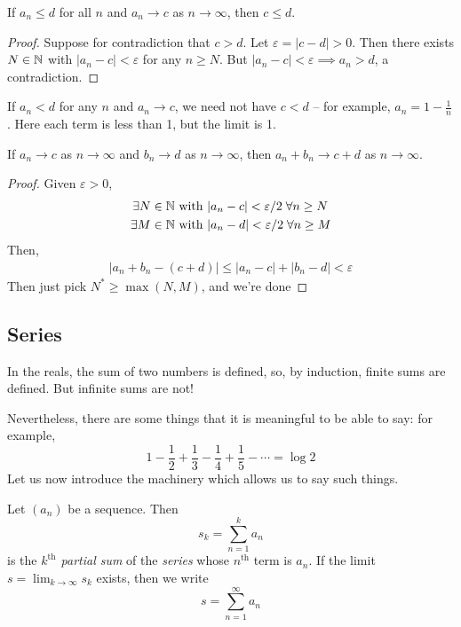 \documentclass{../template/note}
\begin{document}
    \begin{proposition}
        If \(a_n \leq d\) for all \(n\) and \(a_n \to c\) as \(n \to \infty\), then \(c \leq d\).
    \end{proposition}
    
    \begin{proof}
        Suppose for contradiction that \(c > d\). Let \(\varepsilon = |c-d| > 0\). Then there exists \(N \in \mathbb N\) with \(|a_n - c| < \varepsilon\) for any \(n \geq N\). But \(|a_n - c| < \varepsilon \implies a_n > d\), a contradiction.
    \end{proof}
    
    \begin{remark*}
        If \(a_n < d\) for any \(n\) and \(a_n \to c\), we need not have \(c < d\) -- for example, \(a_n = 1 - \frac 1 n\). Here each term is less than 1, but the limit is 1.
    \end{remark*}
    
    \begin{proposition}
        If \(a_n \to c\) as \(n \to \infty\) and \(b_n \to d\) as \(n \to \infty\), then \(a_n + b_n \to c + d\) as \(n \to \infty\).
    \end{proposition}
    
    \begin{proof}
        Given \(\varepsilon > 0\),
        \begin{align*}
            \exists N \in \mathbb N \text{ with } &|a_n - c| < \varepsilon/2 \; \forall n \geq N \\
            \exists M \in \mathbb N \text{ with } &|a_n - d| < \varepsilon/2 \; \forall n \geq M
        \end{align*}
        Then,
        \begin{align*}
            |a_n + b_n - (c + d)| \leq |a_n - c| + |b_n - d| < \varepsilon
        \end{align*}
        Then just pick \(N^* \geq \max(N, M)\), and we're done
    \end{proof}

    
    \subsection{Series}

    In the reals, the sum of two numbers is defined, so, by induction, finite sums are defined. But infinite sums are not!

    Nevertheless, there are some things that it is meaningful to be able to say: for example,
    \[
        1 - \frac 1 2 + \frac 1 3 - \frac 1 4 + \frac 1 5 - \cdots = \log 2
    \]
    Let us now introduce the machinery which allows us to say such things.
    \begin{definition}
        Let \((a_n)\) be a sequence. Then
        \[
            s_k = \sum_{n=1}^k a_n
        \]
        is the \emph{\(k^\text{th}\) partial sum} of the \emph{series} whose \(n^\text{th}\) term is \(a_n\). If the limit \(s = \lim_{k \to \infty}s_k\) exists, then we write
        \[  
            s = \sum_{n=1}^\infty a_n
        \]
    \end{definition}
    
\end{document}
